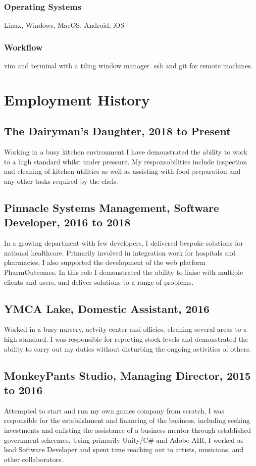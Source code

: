 \documentclass{article}
\begin{document}
\subsubsection{Operating Systems}
Linux, Windows, MacOS, Android, iOS
\subsubsection{Workflow}
vim and terminal with a tiling window manager. ssh and git for remote machines.

\section{Employment History}
\subsection{The Dairyman's Daughter, 2018 to Present}
Working in a busy kitchen environment I have demonstrated the ability to work to a high standard whilst under pressure.  My responsobilities include inspection and cleaning of kitchen utilities as well as assisting with food preparation and any other tasks required by the chefs.
\subsection{Pinnacle Systems Management, Software Developer, 2016 to 2018}
In a growing department with few developers, I delivered bespoke solutions for national healthcare.  Primarily involved in integration work for hospitals and pharmacies, I also supported the development of the web platform PharmOutcomes.  In this role I demonstrated the ability to liaise with multiple clients and users, and deliver solutions to a range of problems.
\subsection{YMCA Lake, Domestic Assistant, 2016}
Worked in a busy nursery, actvity center and officies, cleaning several areas to a high standard.  I was responsible for reporting stock levels and demonstrated the ability to carry out my duties without disturbing the ongoing activities of others.
\subsection{MonkeyPants Studio, Managing Director, 2015 to 2016}
Attempted to start and run my own games company from scratch, I was responsible for the estabilshment and financing of the business, including seeking investments and enlisting the assistance of a business mentor through established government scheemes.  Using primarily Unity/C\# and Adobe AIR, I worked as lead Software Developer and spent time reaching out to artists, musicians, and other collaborators.
\end{document}
